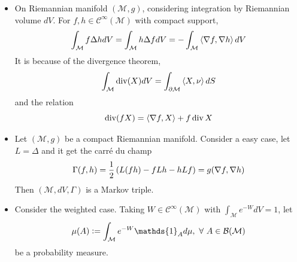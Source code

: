\documentclass[a4paper,12pt]{article}
\begin{document}
\begin{itemize}
  \item On Riemannian manifold $(\mathcal{M},g)$, considering integration by Riemannian volume $dV$. For $f,h \in \mathcal{C}^\infty(\mathcal{M})$ with compact support,
  \begin{equation*}
    \int_{\mathcal{M}}f\Delta h dV = \int_{\mathcal{M}} h \Delta f dV = - \int_{\mathcal{M}} \left\langle \nabla f, \nabla h \right\rangle dV
  \end{equation*}
  It is because of the divergence theorem,
  \begin{equation*}
    \int_{\mathcal{M}}\operatorname{div}(X) dV = \int_{\partial \mathcal{M}} \left\langle X,\nu \right\rangle dS
  \end{equation*}
  and the relation
  \begin{equation*}
    \operatorname{div}(fX) = \left\langle \nabla f,X \right\rangle + f\operatorname{div}X
  \end{equation*}

  \item Let $(\mathcal{M},g)$ be a compact Riemannian manifold. Consider a easy case, let $L = \Delta$ and it get the carr\'e du champ
  \begin{equation*}
    \Gamma(f,h) = \frac{1}{2}\left(L(fh) - fLh - hLf\right) = g(\nabla f, \nabla h)
  \end{equation*}
  Then $(\mathcal{M},dV,\Gamma)$ is a Markov triple.

  \item Consider the weighted case. Taking $W \in \mathcal{C}^\infty(\mathcal{M})$ with $\int_\mathcal{M} e^{-W}dV = 1$, let
  \begin{equation*}
    \mu(A) \defeq \int_\mathcal{M} e^{-W}\mathds{1}_Ad\mu,~\forall~A \in \mathcal{B}(\mathcal{M})
  \end{equation*}
  be a probability measure.


\end{itemize}
\end{document}

